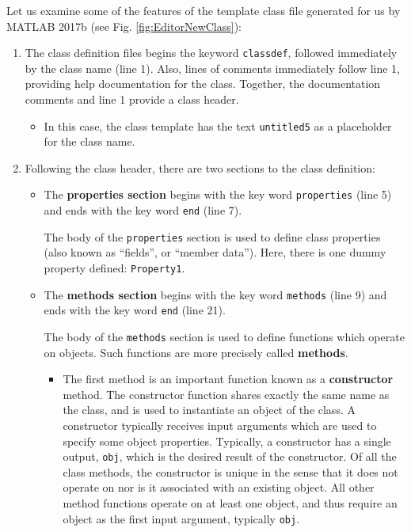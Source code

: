 Let us examine some of the features of the template class file generated for us by MATLAB 2017b (see Fig. \ref{fig:EditorNewClass}):
\begin{enumerate}
\item The class definition files begins the keyword \texttt{classdef}, followed immediately by the class name (line 1). Also, lines of comments immediately follow line 1, providing help documentation for the class. Together, the documentation comments and line 1 provide a class header. 
\begin{itemize}
\item In this case, the class template has the text \texttt{untitled5} as a placeholder for the class name.
\end{itemize}

\item Following the class header, there are two sections to the class definition:
\begin{itemize}
\item The \textbf{properties section} begins with the key word \texttt{properties} (line 5) and ends with the key word \texttt{end} (line 7).

The body of the \texttt{properties} section is used to define class properties (also known as ``fields'', or ``member data''). Here, there is one dummy property defined: \texttt{Property1}.

\item The \textbf{methods section} begins with the key word \texttt{methods} (line 9) and ends with the key word \texttt{end} (line 21).

The body of the \texttt{methods} section is used to define functions which operate on objects. Such functions are more precisely called \textbf{methods}.

\begin{itemize}
\item The first method is an important function known as a \textbf{constructor} method. The constructor function shares exactly the same name as the class, and is used to instantiate an object of the class. A constructor typically receives input arguments which are used to specify some object properties. Typically, a constructor has a single output, \texttt{obj}, which is the desired result of the constructor. Of all the class methods, the constructor is unique in the sense that it does not operate on nor is it associated with an existing object. All other method functions operate on at least one object, and thus require an object as the first input argument, typically \texttt{obj}.


\end{itemize}
\end{itemize}
\end{enumerate}
